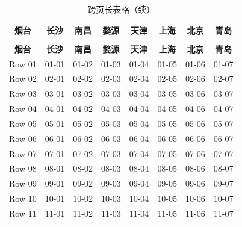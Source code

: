 \documentclass[
    report,     %
    oneside,    %
    UTF8,       %
    zihao=-4    %
]{config} %
\begin{document}
\renewcommand\arraystretch{0.85} %
\begin{longtable}{cccccccc}
    \caption{跨页长表格} \\ %
    
    \toprule[1.5pt]
        \textbf{烟台} & \textbf{长沙} & \textbf{南昌} & \textbf{婺源} & \textbf{天津} & \textbf{上海} & \textbf{北京} & \textbf{青岛} \\ %
    \midrule[0.75pt]
    \endfirsthead
    
    \caption[]{跨页长表格（续）} \\ %
    \toprule[1.5pt]
        \textbf{烟台} & \textbf{长沙} & \textbf{南昌} & \textbf{婺源} & \textbf{天津} & \textbf{上海} & \textbf{北京} & \textbf{青岛} \\  %
    \midrule[0.75pt]
    \endhead
        \bottomrule[1.5pt]
    \endfoot 
    \bottomrule[1.5pt]
    \endlastfoot
    \label{tab:longTable}
        Row 01 & 01-01 & 01-02 & 01-03 & 01-04 & 01-05 & 01-06 & 01-07 \\
        Row 02 & 02-01 & 02-02 & 02-03 & 02-04 & 02-05 & 02-06 & 02-07 \\
        Row 03 & 03-01 & 03-02 & 03-03 & 03-04 & 03-05 & 03-06 & 03-07 \\
        Row 04 & 04-01 & 04-02 & 04-03 & 04-04 & 04-05 & 04-06 & 04-07 \\
        Row 05 & 05-01 & 05-02 & 05-03 & 05-04 & 05-05 & 05-06 & 05-07 \\
        Row 06 & 06-01 & 06-02 & 06-03 & 06-04 & 06-05 & 06-06 & 06-07 \\
        Row 07 & 07-01 & 07-02 & 07-03 & 07-04 & 07-05 & 07-06 & 07-07 \\
        Row 08 & 08-01 & 08-02 & 08-03 & 08-04 & 08-05 & 08-06 & 08-07 \\
        Row 09 & 09-01 & 09-02 & 09-03 & 09-04 & 09-05 & 09-06 & 09-07 \\
        Row 10 & 10-01 & 10-02 & 10-03 & 10-04 & 10-05 & 10-06 & 10-07 \\
        Row 11 & 11-01 & 11-02 & 11-03 & 11-04 & 11-05 & 11-06 & 11-07 \\
\end{longtable}
\vspace{-0.5em}  %




\end{document}
